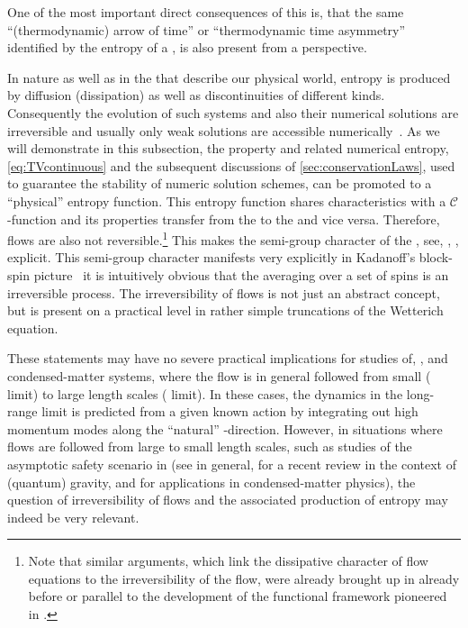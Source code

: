 One of the most important direct consequences of this is, that the same ``(thermodynamic) arrow of time'' or ``thermodynamic time asymmetry''~\cite{Lebowitz:2008} identified by the entropy of a \pde{}, is also present from a \frg{} perspective.

In nature as well as in the \pdes{} that describe our physical world, entropy is produced by diffusion (dissipation) as well as discontinuities of different kinds.
Consequently the evolution of such systems and also their numerical solutions are irreversible and usually only weak solutions are accessible numerically~\cite{Lax1973,Ames:1992,LeVeque:1992,LeVeque:2002,Hesthaven2007,Toro2009,RezzollaZanotti:2013}.
As we will demonstrate in this subsection, the  property and related numerical entropy, \cf{} \cref{eq:TVcontinuous} and the subsequent discussions of \cref{sec:conservationLaws}, used to guarantee the stability of numeric solution schemes, can be promoted to a ``physical'' entropy function.
This entropy function shares characteristics with a $\mathcal{C}$-function and its properties transfer from the \pde{} to the \qft{} and vice versa.
Therefore, \grg{} flows are also not reversible.\footnote{Note that similar arguments, which link the dissipative character of \rg{} flow equations to the irreversibility of the \rg{} flow, were already brought up in  already before or parallel to the development of the functional \rg{} framework pioneered in .} This makes the semi-group character of the \rg{}, see, \eg{}, , explicit.
This semi-group character manifests very explicitly in Kadanoff's block-spin picture~\cite{Kadanoff:1966wm,Wilson:1971bg,Wilson:1971dh,Wilson:1979qg} \dash{} it is intuitively obvious that the averaging over a set of spins is an irreversible process.
The irreversibility of \grg{} flows is not just an abstract concept, but is present on a practical level in rather simple truncations of the Wetterich equation. 

These statements may have no severe practical implications for studies of, \eg{}, \qcd{} and condensed-matter systems, where the \grg{} flow is in general  followed from small (\uv{} limit) to large length scales (\ir{} limit).
In these cases, the dynamics in the long-range limit is predicted from a given known \uv{} action by integrating out high momentum modes along the ``natural'' \rgtime{}-direction.
However, in situations where \grg{} flows are followed from large to small length scales, such as studies of the asymptotic safety scenario in \qfts{} (see  in general,  for a recent review in the context of (quantum) gravity, and  for applications in condensed-matter physics), the question of irreversibility of \grg{} flows and the associated production of entropy may indeed be very relevant.

